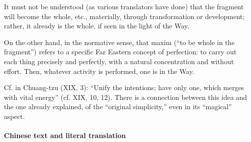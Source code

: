 It must not be understood (as various translators have done) that the fragment will become the whole, etc., materially, through transformation or development; rather, it already is the whole, if seen in the light of the Way.

On the other hand, in the normative sense, that maxim (``to be whole in the fragment'') refers to a specific Far Eastern concept of perfection: to carry out each thing precisely and perfectly, with a natural concentration and without effort. Then, whatever activity is performed, one is in the Way.

Cf. in Chuang-tzu (XIX, 3): ``Unify the intentions; have only one, which merges with vital energy'' (cf. XIX, 10, 12). There is a connection between this idea and the one already explained, of the ``original simplicity,'' even in its ``magical'' aspect.

\paragraph{Chinese text and literal translation}

